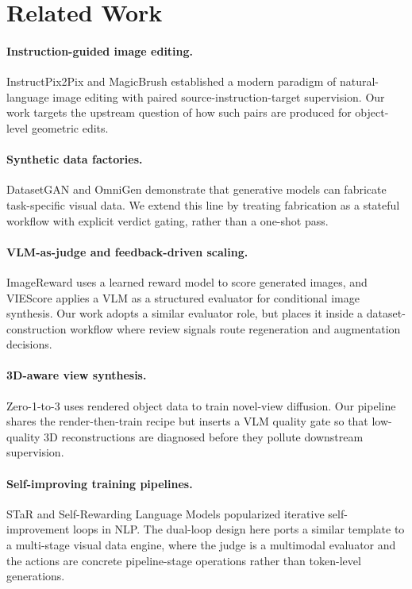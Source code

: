 \section{Related Work}
\label{sec:related}

\paragraph{Instruction-guided image editing.}
InstructPix2Pix \cite{brooks2023instructpix2pix} and MagicBrush \cite{zhang2023magicbrush} established a modern paradigm of natural-language image editing with paired source-instruction-target supervision. Our work targets the upstream question of how such pairs are produced for object-level geometric edits.

\paragraph{Synthetic data factories.}
DatasetGAN \cite{zhang2021datasetgan} and OmniGen \cite{xiao2024omnigen} demonstrate that generative models can fabricate task-specific visual data. We extend this line by treating fabrication as a stateful workflow with explicit verdict gating, rather than a one-shot pass.

\paragraph{VLM-as-judge and feedback-driven scaling.}
ImageReward \cite{xu2023imagereward} uses a learned reward model to score generated images, and VIEScore \cite{ku2024viescore} applies a VLM as a structured evaluator for conditional image synthesis. Our work adopts a similar evaluator role, but places it inside a dataset-construction workflow where review signals route regeneration and augmentation decisions.

\paragraph{3D-aware view synthesis.}
Zero-1-to-3 \cite{liu2023zero1to3} uses rendered object data to train novel-view diffusion. Our pipeline shares the render-then-train recipe but inserts a VLM quality gate so that low-quality 3D reconstructions are diagnosed before they pollute downstream supervision.

\paragraph{Self-improving training pipelines.}
STaR \cite{zelikman2022star} and Self-Rewarding Language Models \cite{yuan2024selfrewarding} popularized iterative self-improvement loops in NLP. The dual-loop design here ports a similar template to a multi-stage visual data engine, where the judge is a multimodal evaluator and the actions are concrete pipeline-stage operations rather than token-level generations.
